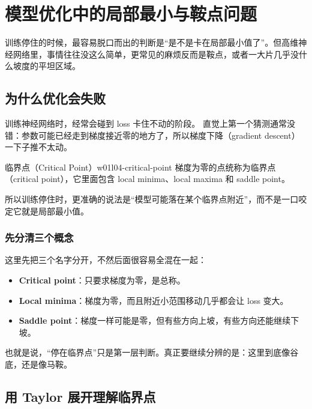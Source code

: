 \documentclass[main.tex]{subfiles}
\begin{document}
\chapter{模型优化中的局部最小与鞍点问题}
\label{chap:w01l04-local-minima-and-saddle-points}

\begin{warningbox}
训练停住的时候，最容易脱口而出的判断是“是不是卡在局部最小值了”。但高维神经网络里，事情往往没这么简单，更常见的麻烦反而是鞍点，或者一大片几乎没什么坡度的平坦区域。
\end{warningbox}

\section{为什么优化会失败}
\label{sec:w01l04-why-fail}

训练神经网络时，经常会碰到 loss 卡住不动的阶段。
直觉上第一个猜测通常没错：参数可能已经走到梯度接近零的地方了，所以梯度下降（gradient descent）一下子推不太动。

\begin{definition}{临界点（Critical Point）}{w01l04-critical-point}
梯度为零的点统称为临界点（critical point），它里面包含 local minima、local maxima 和 saddle point。
\end{definition}

所以训练停住时，更准确的说法是“模型可能落在某个临界点附近”，而不是一口咬定它就是局部最小值。

\subsection{先分清三个概念}
\label{sec:w01l04-three-points}

这里先把三个名字分开，不然后面很容易全混在一起：
\begin{itemize}
  \item \textbf{Critical point}：只要求梯度为零，是总称。
  \item \textbf{Local minima}：梯度为零，而且附近小范围移动几乎都会让 loss 变大。
  \item \textbf{Saddle point}：梯度一样可能是零，但有些方向上坡，有些方向还能继续下坡。
\end{itemize}

也就是说，“停在临界点”只是第一层判断。真正要继续分辨的是：这里到底像谷底，还是像马鞍。

\section{用 Taylor 展开理解临界点}
\label{sec:w01l04-taylor}
\end{document}
